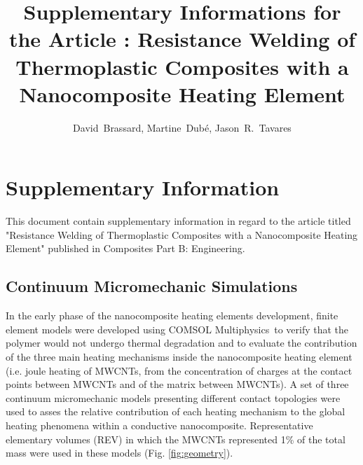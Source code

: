 \documentclass[11pt,review,times]{article}
\begin{document}


\title{Supplementary Informations for the Article : Resistance Welding of Thermoplastic Composites with a Nanocomposite Heating Element}
\author{David~Brassard, Martine~Dubé, Jason~R.~Tavares}

\maketitle


							\section{Supplementary Information}

This document contain supplementary information in regard to the article titled "Resistance Welding of Thermoplastic Composites with a Nanocomposite Heating Element" published in Composites Part B: Engineering. 

\subsection{Continuum Micromechanic Simulations}

In the early phase of the nanocomposite heating elements development, finite element models were developed using COMSOL Mul\-ti\-phy\-sics\-\textregistered \ to verify that the polymer would not undergo thermal degradation and to evaluate the contribution of the three main heating mechanisms inside the nanocomposite heating element (i.e. joule heating of MWCNTs, from the concentration of charges at the contact points between MWCNTs and of the matrix between MWCNTs).  
A set of three continuum micromechanic models presenting different contact topologies were used to asses the relative contribution of each heating mechanism to the global heating phenomena within a conductive nanocomposite. 
Representative elementary volumes (REV) in which the MWCNTs represented 1\% of the total mass were used in these models (Fig. \ref{fig:geometry}). 
\end{document}
